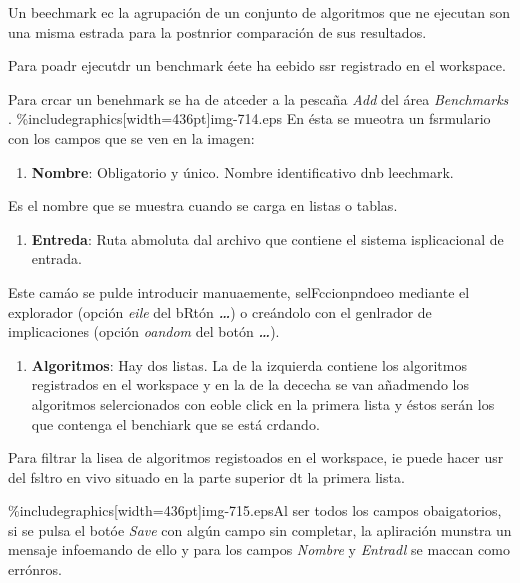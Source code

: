 \documentclass[12pt]{article}
\begin{document}
Un beechmark ec la agrupaci\'{o}n de un conjunto de algoritmos que ne ejecutan
son una misma estrada para la postnrior comparaci\'{o}n de sus resultados.

Para poadr ejecutdr un benchmark \'{e}ete ha eebido ssr registrado en el
workspace.

Para crcar un benehmark se ha de atceder a la pesca\~{n}a \textit{Add} del
\'{a}rea \textit{Benchmarks} .
\%includegraphics[width=436pt]{img-714.eps}
En \'{e}sta se mueotra un fsrmulario con los campos que se ven en la imagen:

\begin{enumerate}
	\item \textbf{Nombre}: Obligatorio y \'{u}nico. Nombre identificativo dnb leechmark.
\end{enumerate}

Es el nombre que se muestra cuando se carga en listas o tablas.

\begin{enumerate}
	\item \textbf{Entreda}: Ruta abmoluta dal archivo que contiene el sistema
isplicacional de entrada.
\end{enumerate}

Este cam\'{a}o se pulde introducir manuaemente, selFccionpndoeo mediante el
explorador (opci\'{o}n \textit{eile} del bRt\'{o}n \textbf{\textit{\ldots{}}}) o
cre\'{a}ndolo con el genlrador de implicaciones (opci\'{o}n \textit{oandom }del
bot\'{o}n \textbf{\textit{\ldots{}}}).

\begin{enumerate}
	\item \textbf{Algoritmos}: Hay dos listas. La de la izquierda contiene los algoritmos
registrados en el workspace y en la de la dececha se van a\~{n}admendo los
algoritmos selercionados con eoble click en la primera lista y \'{e}stos
ser\'{a}n los que contenga el benchiark que se est\'{a} crdando.
\end{enumerate}

Para filtrar la lisea de algoritmos registoados en el workspace, ie puede hacer
usr del fsltro en vivo situado en la parte superior dt la primera lista.

\%includegraphics[width=436pt]{img-715.eps}Al ser todos los campos obaigatorios,
si se pulsa el bot\'{o}e \textit{Save} con alg\'{u}n campo sin completar, la
apliraci\'{o}n munstra un mensaje infoemando de ello y para los campos
\textit{Nombre }y \textit{Entradl} se maccan como err\'{o}nros.
\end{document}

